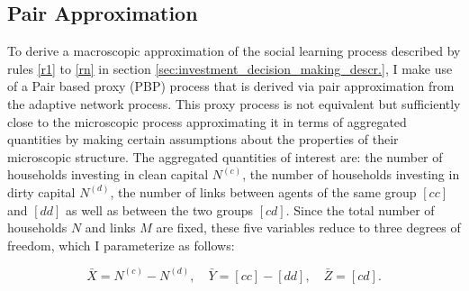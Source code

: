 \subsection{Pair Approximation}
\label{sec:pair_approximation}
To derive a macroscopic approximation of the social learning process described by rules \ref{r1} to \ref{rn} in section \ref{sec:investment_decision_making_descr.}, I make use of a Pair based proxy (PBP) process that is derived via pair approximation from the adaptive network process. This proxy process is not equivalent but sufficiently close to the microscopic process approximating it in terms of aggregated quantities by making certain assumptions about the properties of their microscopic structure. The aggregated quantities of interest are: the number of households investing in clean capital $N^{(c)}$, the number of households investing in dirty capital $N^{(d)}$, the number of links between agents of the same group $[cc]$ and $[dd]$ as well as between the two groups $[cd]$. Since the total number of households $N$ and links $M$ are fixed, these five variables reduce to three degrees of freedom, which I parameterize as follows:

\begin{equation}
	\bar{X} = N^{(c)} - N^{(d)}, \quad \bar{Y} = [cc] - [dd], \quad \bar{Z} = [cd].
	\label{eq:opinion_formation_macro_variables}
\end{equation}

